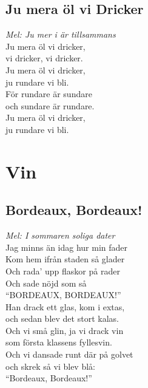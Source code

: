 \documentclass[twoside, openright]{report}
\begin{document}
\section{Ju mera öl vi Dricker}
\textit{Mel: Ju mer i är tillsammans}\\

Ju mera öl vi dricker,\\
vi dricker, vi dricker.\\
Ju mera öl vi dricker,\\
ju rundare vi bli.\\
För rundare är sundare\\
och sundare är rundare.\\
Ju mera öl vi dricker,\\
ju rundare vi bli.\\

\chapter{Vin}

\section{Bordeaux, Bordeaux!}
\textit{Mel: I sommaren soliga dater}\\

Jag minns än idag hur min fader\\
Kom hem ifrån staden så glader\\
Och rada’ upp flaskor på rader\\
Och sade nöjd som så\\
``BORDEAUX, BORDEAUX!''\\

Han drack ett glas, kom i extas,\\
och sedan blev det stort kalas.\\
Och vi små glin, ja vi drack vin\\
som första klassens fyllesvin.\\
Och vi dansade runt där på golvet\\
och skrek så vi blev blå:\\
``Bordeaux, Bordeaux!''\\
\end{document}
